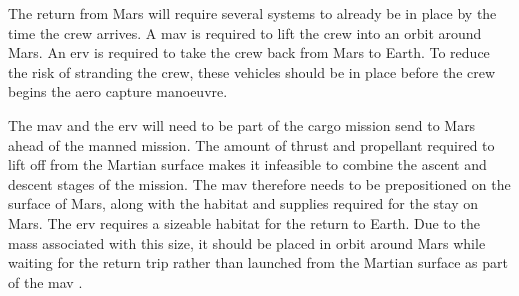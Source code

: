 The return from Mars will require several systems to already be in place by the time the crew arrives. A \gls{mav} is required to lift the crew into an orbit around Mars. An \gls{erv} is required to take the crew back from Mars to Earth. To reduce the risk of stranding the crew, these vehicles should be in place before the crew begins the aero capture manoeuvre. 

The \gls{mav} and the \gls{erv} will need to be part of the cargo mission send to Mars ahead of the manned mission. The amount of thrust and propellant required to lift off from the Martian surface makes it infeasible to combine the ascent and descent stages of the mission. The \gls{mav} therefore needs to be prepositioned on the surface of Mars, along with the habitat and  supplies required for the stay on Mars. The \gls{erv} requires a sizeable habitat for the return to Earth. Due to the mass associated with this size, it should be placed in orbit around Mars while waiting for the return trip rather than launched from the Martian surface as part of the \gls{mav} \cite{hoffman1997}. 



